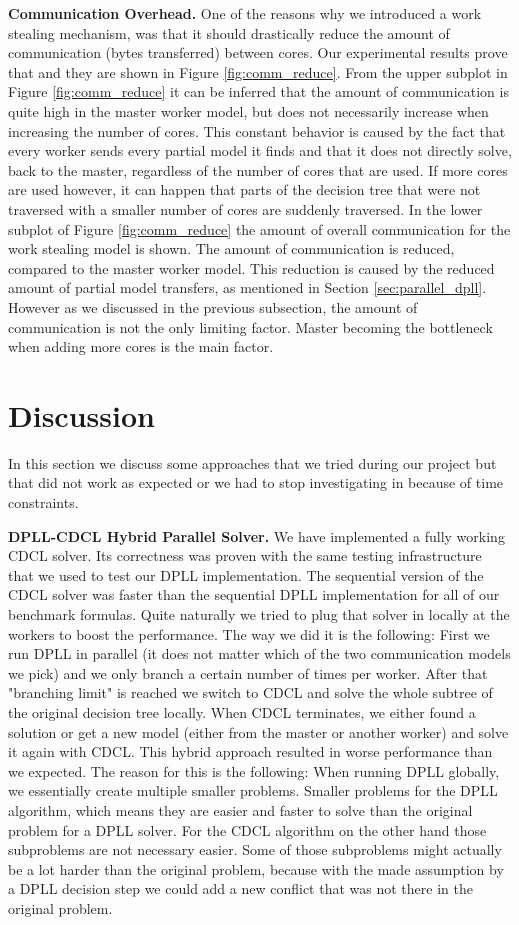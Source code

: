 \documentclass[letterpaper]{article}
\newcommand{\mypar}[1]{{\bf #1.}}
\begin{document}
\mypar{Communication Overhead}
One of the reasons why we introduced a work stealing mechanism,
was that it should drastically reduce the amount of communication (bytes transferred) between cores.
Our experimental results prove that and they are shown in Figure \ref{fig:comm_reduce}.
From the upper subplot in Figure \ref{fig:comm_reduce} it can be inferred that the amount of communication is quite high in the master worker model,
but does not necessarily increase when increasing the number of cores.
This constant behavior is caused by the fact that every worker sends every partial model it finds and that it does not directly solve, back to the master,
regardless of the number of cores that are used.
If more cores are used however, it can happen that parts of the decision tree that were not traversed with a smaller number of cores are suddenly traversed.
In the lower subplot of Figure \ref{fig:comm_reduce} the amount of overall communication for the work stealing model is shown.
The amount of communication is reduced, compared to the master worker model.
This reduction is caused by the reduced amount of partial model transfers, as mentioned in Section \ref{sec:parallel_dpll}.
However as we discussed in the previous subsection, the amount of communication is not the only limiting factor.
Master becoming the bottleneck when adding more cores is the main factor.

\section{Discussion}\label{sec:discussion}
In this section we discuss some approaches that we tried during our project but that did not work as expected or we had to stop investigating in because of time constraints.

\mypar{DPLL-CDCL Hybrid Parallel Solver}
We have implemented a fully working CDCL solver.
Its correctness was proven with the same testing infrastructure that we used to test our DPLL implementation.
The sequential version of the CDCL solver was faster than the sequential DPLL implementation for all of our benchmark formulas.
Quite naturally we tried to plug that solver in locally at the workers to boost the performance.
The way we did it is the following:
First we run DPLL in parallel (it does not matter which of the two communication models we pick) and we only branch a certain number of times per worker.
After that "branching limit" is reached we switch to CDCL and solve the whole subtree of the original decision tree locally.
When CDCL terminates, we either found a solution or get a new model (either from the master or another worker) and solve it again with CDCL.
This hybrid approach resulted in worse performance than we expected.
The reason for this is the following:
When running DPLL globally, we essentially create multiple smaller problems.
Smaller problems for the DPLL algorithm, which means they are easier and faster to solve than the original problem for a DPLL solver.
For the CDCL algorithm on the other hand those subproblems are not necessary easier.
Some of those subproblems might actually be a lot harder than the original problem,
because with the made assumption by a DPLL decision step we could add a new conflict that was not there in the original problem.
\end{document}
